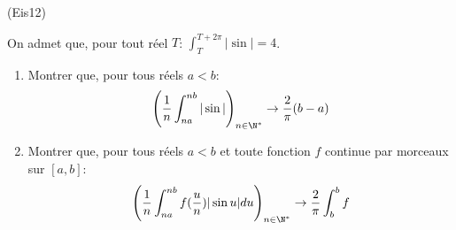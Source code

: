 \begin{tiny}(Eis12)\end{tiny}
On admet que, pour tout réel $T$: $\int_{T}^{T+2\pi}|\sin| = 4$.
\begin{enumerate}
 \item Montrer que, pour tous réels $a<b$:
\begin{displaymath}
 \left(\frac{1}{n}\int_{na}^{nb}|\sin | \right)_{n\in\N^*} \rightarrow \frac{2}{\pi}(b-a)
\end{displaymath}
 \item Montrer que, pour tous réels $a<b$ et toute fonction $f$ continue par morceaux sur $[a,b]$:
\begin{displaymath}
 \left(\frac{1}{n}\int_{na}^{nb}f(\frac{u}{n})|\sin u| du \right)_{n\in\N^*} \rightarrow \frac{2}{\pi}\int_b ^b f
\end{displaymath}
\end{enumerate}
